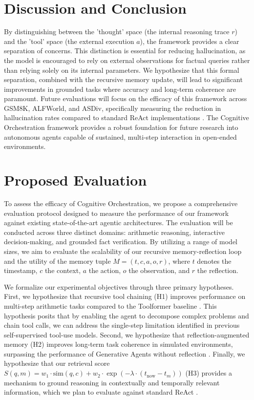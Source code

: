 \documentclass[11pt,a4paper]{article}
\begin{document}
\section{Discussion and Conclusion}
By distinguishing between the 'thought' space (the internal reasoning trace $r$) and the 'tool' space (the external execution $a$), the framework provides a clear separation of concerns. This distinction is essential for reducing hallucination, as the model is encouraged to rely on external observations for factual queries rather than relying solely on its internal parameters. We hypothesize that this formal separation, combined with the recursive memory update, will lead to significant improvements in grounded tasks where accuracy and long-term coherence are paramount. Future evaluations will focus on the efficacy of this framework across GSM8K, ALFWorld, and ASDiv, specifically measuring the reduction in hallucination rates compared to standard ReAct implementations \cite{yao2023}. The Cognitive Orchestration framework provides a robust foundation for future research into autonomous agents capable of sustained, multi-step interaction in open-ended environments.

\section{Proposed Evaluation}
To assess the efficacy of Cognitive Orchestration, we propose a comprehensive evaluation protocol designed to measure the performance of our framework against existing state-of-the-art agentic architectures. The evaluation will be conducted across three distinct domains: arithmetic reasoning, interactive decision-making, and grounded fact verification. By utilizing a range of model sizes, we aim to evaluate the scalability of our recursive memory-reflection loop and the utility of the memory tuple $M = (t, c, a, o, r)$, where $t$ denotes the timestamp, $c$ the context, $a$ the action, $o$ the observation, and $r$ the reflection.

We formalize our experimental objectives through three primary hypotheses. First, we hypothesize that recursive tool chaining (H1) improves performance on multi-step arithmetic tasks compared to the Toolformer baseline \cite{schick2023}. This hypothesis posits that by enabling the agent to decompose complex problems and chain tool calls, we can address the single-step limitation identified in previous self-supervised tool-use models. Second, we hypothesize that reflection-augmented memory (H2) improves long-term task coherence in simulated environments, surpassing the performance of Generative Agents without reflection \cite{park2023}. Finally, we hypothesize that our retrieval score $S(q, m) = w_1 \cdot \text{sim}(q, c) + w_2 \cdot \exp(-\lambda \cdot (t_{\text{now}} - t_m))$ (H3) provides a mechanism to ground reasoning in contextually and temporally relevant information, which we plan to evaluate against standard ReAct \cite{yao2023}.
\end{document}
